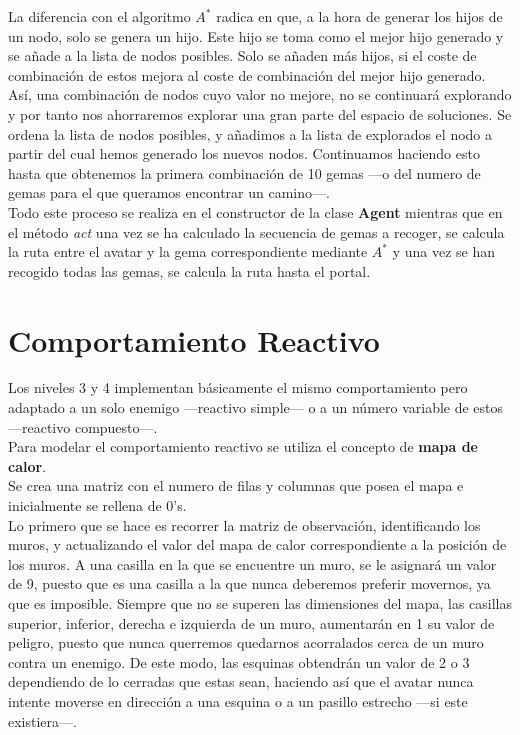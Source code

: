 La diferencia con el algoritmo $ A^{*} $ radica en que, a la hora de generar los hijos de un nodo, solo se genera un hijo. Este hijo se toma como el mejor hijo generado y se añade a la lista de nodos posibles. Solo se añaden más hijos, si el coste de combinación de estos mejora al coste de combinación del mejor hijo generado. Así, una combinación de nodos cuyo valor no mejore, no se continuará explorando y por tanto nos ahorraremos explorar una gran parte del espacio de soluciones. Se ordena la lista de nodos posibles, y añadimos a la lista de explorados el nodo a partir del cual hemos generado los nuevos nodos. Continuamos haciendo esto hasta que obtenemos la primera combinación de 10 gemas ---o del numero de gemas para el que queramos encontrar un camino---.\\

Todo este proceso se realiza en el constructor de la clase \textbf{Agent} mientras que en el método \emph{act} una vez se ha calculado la secuencia de gemas a recoger, se calcula la ruta entre el avatar y la gema correspondiente mediante $ A^{*} $ y una vez se han recogido todas las gemas, se calcula la ruta hasta el portal.


\newpage
\chapter{Comportamiento Reactivo}
Los niveles 3 y 4 implementan básicamente el mismo comportamiento pero adaptado a un solo enemigo ---reactivo simple--- o a un  número variable de estos ---reactivo compuesto---.\\

Para modelar el comportamiento reactivo se utiliza el concepto de \textbf{mapa de calor}.\\
Se crea una matriz con el numero de filas y columnas que posea el mapa e inicialmente se rellena de 0's.\\
Lo primero que se hace es recorrer la matriz de observación, identificando los muros, y actualizando el valor del mapa de calor correspondiente a la posición de los muros. A una casilla en la que se encuentre un muro, se le asignará un valor de 9, puesto que es una casilla a la que nunca deberemos preferir movernos, ya que es imposible. Siempre que no se superen las dimensiones del mapa, las casillas superior, inferior, derecha e izquierda de un muro, aumentarán en 1 su valor de peligro, puesto que nunca querremos quedarnos acorralados cerca de un muro contra un enemigo. De este modo, las esquinas obtendrán un valor de 2 o 3 dependiendo de lo cerradas que estas sean, haciendo así que el avatar nunca intente moverse en dirección a una esquina o a un pasillo estrecho ---si este existiera---.\\

